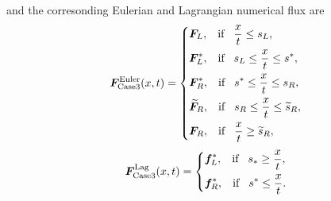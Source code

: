 \documentclass{article}
\numberwithin{equation}{section}
\numberwithin{table}{section}
\begin{document}
  and the corresonding Eulerian and Lagrangian numerical flux are 
 \begin{equation}\label{eq:HLLCEP3}
   \bm{F}^{\text{Euler}}_{\text{Case3}}(x,t) = \left\{ \begin{aligned}
		& \bm{F}_L, \hspace{0.3cm} \text{if} \hspace{0.3cm} \frac{x}{t}\le s_L, \\
		& \bm{F}_L^*, \hspace{0.3cm} \text{if} \hspace{0.3cm} s_L\le \frac{x}{t} \le s^*, \\
		& \bm{F}_R^*, \hspace{0.3cm} \text{if} \hspace{0.3cm} s^*\le \frac{x}{t} \le s_R, \\
		&  \widetilde{\bm{F}}_R, \hspace{0.3cm} \text{if} \hspace{0.3cm} s_R\le \frac{x}{t} \le \widetilde{s}_R,\\
		& \bm{F}_R, \hspace{0.3cm} \text{if} \hspace{0.3cm} \frac{x}{t}\ge \widetilde{s}_R, \\
	  \end{aligned}
	\right.
  \end{equation}
\begin{equation}
	\bm{F}^{\text{Lag}}_{\text{Case3}}(x,t) = \left\{ \begin{aligned}
		& \bm{f}_L^*, \hspace{0.3cm} \text{if} \hspace{0.3cm} s_*\ge \frac{x}{t},\\
		& \bm{f}_R^*, \hspace{0.3cm} \text{if} \hspace{0.3cm} s^*\le \frac{x}{t}.\\
	  \end{aligned}
	\right.
  \end{equation}
\end{document}
